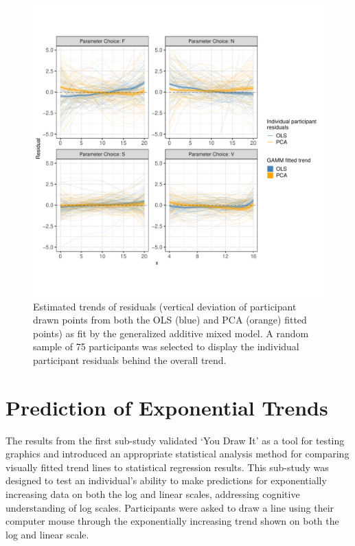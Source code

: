 \documentclass[print]{nuthesis}
\begin{document}
\begin{figure}[tbp]

{\centering \includegraphics[width=1\linewidth,]{thesis_files/figure-latex/eyefitting-gamm-residualplots-1} 

}

\caption[Eye Fitting Straight Lines in the Modern Era GAMM results]{Estimated trends of residuals (vertical deviation of participant drawn points from both the OLS (blue) and PCA (orange) fitted points) as fit by the generalized additive mixed model. A random sample of 75 participants was selected to display the individual participant residuals behind the overall trend.}\label{fig:eyefitting-gamm-residualplots}
\end{figure}

\hypertarget{prediction-of-exponential-trends}{%
\section{Prediction of Exponential Trends}\label{prediction-of-exponential-trends}}

The results from the first sub-study validated `You Draw It' as a tool for testing graphics and introduced an appropriate statistical analysis method for comparing visually fitted trend lines to statistical regression results.
This sub-study was designed to test an individual's ability to make predictions for exponentially increasing data on both the log and linear scales, addressing cognitive understanding of log scales.
Participants were asked to draw a line using their computer mouse through the exponentially increasing trend shown on both the log and linear scale.
\end{document}

